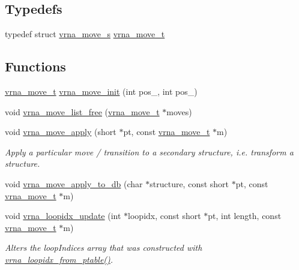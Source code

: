 \subsection*{Typedefs}
\begin{DoxyCompactItemize}
\item 
typedef struct \mbox{\hyperlink{group__neighbors_structvrna__move__s}{vrna\+\_\+move\+\_\+s}} \mbox{\hyperlink{group__neighbors_ga08630e00206cd163ea29c462bf5f4755}{vrna\+\_\+move\+\_\+t}}
\end{DoxyCompactItemize}
\subsection*{Functions}
\begin{DoxyCompactItemize}
\item 
\mbox{\hyperlink{group__neighbors_ga08630e00206cd163ea29c462bf5f4755}{vrna\+\_\+move\+\_\+t}} \mbox{\hyperlink{group__neighbors_gaeff6157398a2073f587416fa9ec94789}{vrna\+\_\+move\+\_\+init}} (int pos\+\_, int pos\+\_)
\item 
void \mbox{\hyperlink{group__neighbors_gad085062ae3aa7ee20783debe4a906fad}{vrna\+\_\+move\+\_\+list\+\_\+free}} (\mbox{\hyperlink{group__neighbors_ga08630e00206cd163ea29c462bf5f4755}{vrna\+\_\+move\+\_\+t}} $\ast$moves)
\item 
void \mbox{\hyperlink{group__neighbors_gacdbc5f609b46aeb07d2c7e015677a1e0}{vrna\+\_\+move\+\_\+apply}} (short $\ast$pt, const \mbox{\hyperlink{group__neighbors_ga08630e00206cd163ea29c462bf5f4755}{vrna\+\_\+move\+\_\+t}} $\ast$m)
\begin{DoxyCompactList}\small\item\em Apply a particular move / transition to a secondary structure, i.\+e. transform a structure. \end{DoxyCompactList}\item 
void \mbox{\hyperlink{group__neighbors_gabebc731deb0f194b8b666dab0f732c2a}{vrna\+\_\+move\+\_\+apply\+\_\+to\+\_\+db}} (char $\ast$structure, const short $\ast$pt, const \mbox{\hyperlink{group__neighbors_ga08630e00206cd163ea29c462bf5f4755}{vrna\+\_\+move\+\_\+t}} $\ast$m)
\item 
void \mbox{\hyperlink{group__neighbors_ga5ceb55ee56494b1f5b7aaa758cb722d1}{vrna\+\_\+loopidx\+\_\+update}} (int $\ast$loopidx, const short $\ast$pt, int length, const \mbox{\hyperlink{group__neighbors_ga08630e00206cd163ea29c462bf5f4755}{vrna\+\_\+move\+\_\+t}} $\ast$m)
\begin{DoxyCompactList}\small\item\em Alters the loop\+Indices array that was constructed with \mbox{\hyperlink{group__struct__utils_ga03e15af299be0866ff21da880c74b92e}{vrna\+\_\+loopidx\+\_\+from\+\_\+ptable()}}. \end{DoxyCompactList}\item 

\end{DoxyCompactItemize}
